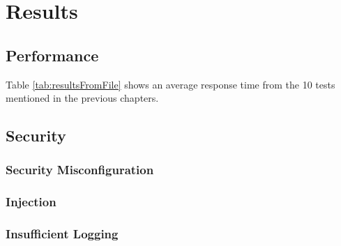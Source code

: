 
\chapter{Results}\label{cha:results}

\section{Performance}

Table \ref{tab:resultsFromFile} shows an average response time from the 10 tests mentioned in the previous chapters.



\section{Security}

\subsection{Security Misconfiguration}
\subsection{Injection}
\subsection{Insufficient Logging}

